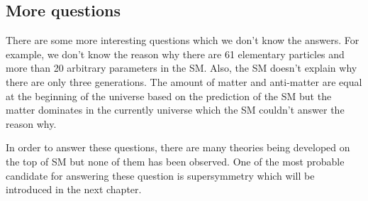 
\subsection{More questions}
\label{subsec:sm_more_questions}
There are some more interesting questions which we don't know the answers.
For example, we don't know the reason why there are 61 elementary particles and more than 20 arbitrary parameters in the SM.
Also, the SM doesn't explain why there are only three generations.
The amount of matter and anti-matter are equal at the beginning of the universe based on the prediction of the SM but the matter dominates in the currently universe which the SM couldn't answer the reason why.

In order to answer these questions, there are many theories being developed on the top of SM but none of them has been observed.
One of the most probable candidate for answering these question is supersymmetry which will be introduced in the next chapter.

